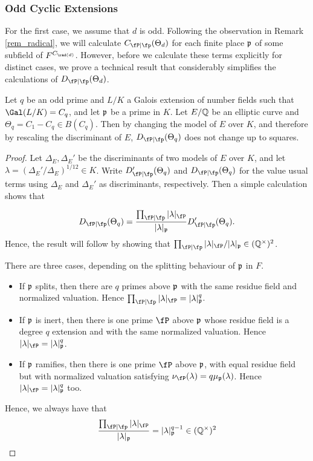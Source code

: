 
\subsubsection{Odd Cyclic Extensions} \label{case_Cp}

For the first case, we assume that $d$ is odd. Following the observation in Remark \ref{rem_radical}, we will calculate $\Cp(\Theta_d)$ for each finite place $\mathfrak{p}$ of some subfield of $F^{C_{\rad(d)}}$. However, before we calculate these terms explicitly for distinct cases, we prove a technical result that considerably simplifies the calculations of $\Dp(\Theta_d)$.

\begin{lemma}
    Let $q$ be an odd prime and $L/K$ a Galois extension of number fields such that $\Gal(L/K)=C_q$, and let $\mathfrak{p}$ be a prime in $K$. Let $E/\mathbb{Q}$ be an elliptic curve and $\Theta_q=C_1-C_q\in B(C_q)$. Then by changing the model of $E$ over $K$, and therefore by rescaling the discriminant of $E$, $\Dp(\Theta_q)$ does not change up to squares.
\end{lemma}
\begin{proof}
    Let $\Delta_E,\Delta_E'$ be the discriminants of two models of $E$ over $K$, and let $\lambda=(\Delta_E'/\Delta_E)^{1/12}\in K$. Write $\Dp'(\Theta_q)$ and $\Dp(\Theta_q)$ for the value usual terms using $\Delta_E$ and $\Delta_E'$ as discriminants, respectively. Then a simple calculation shows that
    
    $$\Dp(\Theta_q)=\frac{\prod_{\fP\mid\fp}|\lambda|_\fP}{|\lambda|_\pp}\Dp'(\Theta_q).$$
    Hence, the result will follow by showing that $\prod_{\fP\mid\fp}|\lambda|_\fP/|\lambda|_\pp\in\QQss$. 
    
    There are three cases, depending on the splitting behaviour of $\mathfrak{p}$ in $F$. 
    \begin{itemize}
        \item If $\mathfrak{p}$ splits, then there are $q$ primes above $\mathfrak{p}$ with the same residue field and normalized valuation. Hence $\prod_{\fP\mid\fp}|\lambda|_\fP=|\lambda|_\pp^q$.
        \item If $\mathfrak{p}$ is inert, then there is one prime $\fP$ above $\mathfrak{p}$ whose residue field is a degree $q$ extension and with the same normalized valuation. Hence $|\lambda|_\fP=|\lambda|_\pp^q$.
        \item If $\mathfrak{p}$ ramifies, then there is one prime $\fP$ above $\mathfrak{p}$, with equal residue field but with normalized valuation satisfying $\nu_\fP(\lambda)=q\mu_\pp(\lambda)$. Hence $|\lambda|_\fP=|\lambda|_\pp^q$ too.
    \end{itemize}
    Hence, we always have that 
    $$\frac{\prod_{\fP\mid\fp}|\lambda|_\fP}{|\lambda|_\pp}=|\lambda|_\pp^{q-1}\in\QQss$$
\end{proof}

